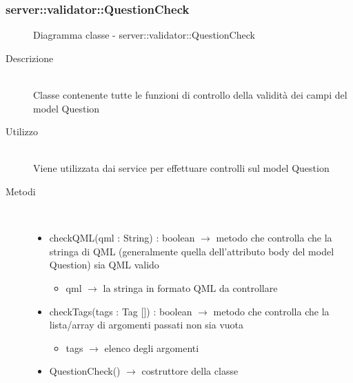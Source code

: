 \subsubsection[QuestionCheck]{server::validator::QuestionCheck}
\begin{figure}[H]
	\centering
	\caption{Diagramma classe - server::validator::QuestionCheck}
\end{figure}\begin{description}
\item[Descrizione] \hfill \\
Classe contenente tutte le funzioni di controllo della validità dei campi del model Question
\item[Utilizzo] \hfill \\
Viene utilizzata dai service per effettuare controlli sul model Question
\item[Metodi] \hfill \\
\vspace{-7mm}
\begin{itemize}
	\item checkQML(qml : String) : boolean $\rightarrow$ metodo che controlla che la stringa di QML (generalmente quella dell'attributo body del model Question) sia QML valido\begin{itemize}
		\item qml $\rightarrow$ la stringa in formato QML da controllare
	\end{itemize}
	
	\item checkTags(tags : Tag []) : boolean $\rightarrow$ metodo che controlla che la lista/array di argomenti passati non sia vuota\begin{itemize}
		\item tags $\rightarrow$ elenco degli argomenti
	\end{itemize}
	
	\item QuestionCheck() $\rightarrow$ costruttore della classe
\end{itemize}

\end{description}